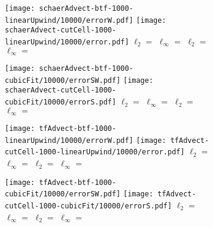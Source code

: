 \begin{figure}
	\centering
	\begin{subfigure}{\textwidth}
		\texttt{[image: schaerAdvect-btf-1000-linearUpwind/10000/errorW.pdf]}
		\texttt{[image: schaerAdvect-cutCell-1000-linearUpwind/10000/error.pdf]}
		$\ell_2 = $
		$\ell_\infty = $
		$\ell_2 = $
		$\ell_\infty = $
	\end{subfigure}
	\begin{subfigure}{\textwidth}
		\texttt{[image: schaerAdvect-btf-1000-cubicFit/10000/errorSW.pdf]}
		\texttt{[image: schaerAdvect-cutCell-1000-cubicFit/10000/errorS.pdf]}
		$\ell_2 = $
		$\ell_\infty = $
		$\ell_2 = $
		$\ell_\infty = $
	\end{subfigure}
	\begin{subfigure}{\textwidth}
		\texttt{[image: tfAdvect-btf-1000-linearUpwind/10000/errorW.pdf]}
		\texttt{[image: tfAdvect-cutCell-1000-linearUpwind/10000/error.pdf]}
		$\ell_2 = $
		$\ell_\infty = $
		$\ell_2 = $
		$\ell_\infty = $
	\end{subfigure}
	\begin{subfigure}{\textwidth}
		\texttt{[image: tfAdvect-btf-1000-cubicFit/10000/errorSW.pdf]}
		\texttt{[image: tfAdvect-cutCell-1000-cubicFit/10000/errorS.pdf]}
		$\ell_2 = $
		$\ell_\infty = $
		$\ell_2 = $
		$\ell_\infty = $
	\end{subfigure}
	\caption{}
	\label{fig:cubicFit:schaerAdvect:error}
\end{figure}

